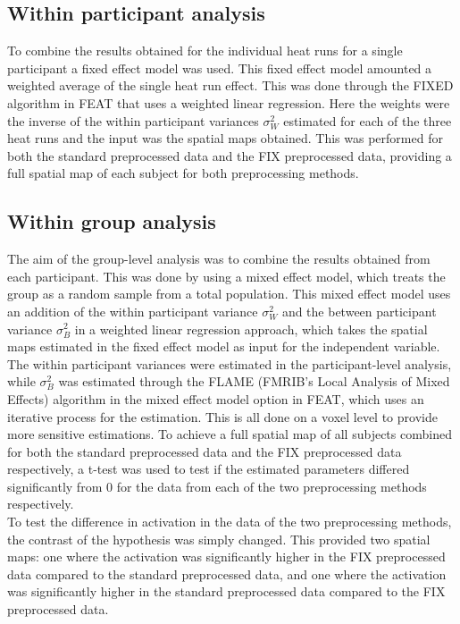 \subsection{Within participant analysis}
To combine the results obtained for the individual heat runs for a single participant a fixed effect model was used. This fixed effect model amounted a weighted average of the single heat run effect. This was done through the FIXED algorithm in FEAT that uses a weighted linear regression. Here the weights were the inverse of the within participant variances $\sigma_{W}^{2}$ estimated for each of the three heat runs and the input was the spatial maps obtained. This was performed for both the standard preprocessed data and the FIX preprocessed data, providing a full spatial map of each subject for both preprocessing methods.

\subsection{Within group analysis}
The aim of the group-level analysis was to combine the results obtained from each participant. This was done by using a mixed effect model, which treats the group as a random sample from a total population. This mixed effect model uses an addition of the within participant variance $\sigma_{W}^{2}$ and the between participant variance $\sigma_{B}^{2}$ in a weighted linear regression approach, which takes the spatial maps estimated in the fixed effect model as input for the independent variable. The within participant variances were estimated in the participant-level analysis, while $\sigma_{B}^{2}$ was estimated through the FLAME (FMRIB's Local Analysis of Mixed Effects) algorithm in the mixed effect model option in FEAT, which uses an iterative process for the estimation. This is all done on a voxel level to provide more sensitive estimations.
To achieve a full spatial map of all subjects combined for both the standard preprocessed data and the FIX preprocessed data respectively, a t-test was used to test if the estimated parameters differed significantly from 0 for the data from each of the two preprocessing methods respectively. \\
To test the difference in activation in the data of the two preprocessing methods, the contrast of the hypothesis was simply changed. This provided two spatial maps: one where the activation was significantly higher in the FIX preprocessed data compared to the standard preprocessed data, and one where the activation was significantly higher in the standard preprocessed data compared to the FIX preprocessed data. 
